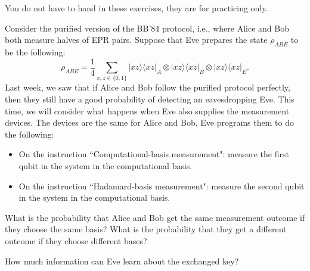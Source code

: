 \documentclass[a4paper,10pt,landscape,twocolumn]{scrartcl}
\newcommand{\ket}[1]{\lvert #1 \rangle}
\newcommand{\bra}[1]{\langle #1 \rvert}
\begin{document}
\practiceproblems

{\sffamily\noindent
You do not have to hand in these exercises, they are for practicing only. %
}

\begin{exercise}
Consider the purified version of the BB'84 protocol, i.e., where Alice and Bob both measure halves of EPR pairs. Suppose that Eve prepares the state $\rho_{ABE}$ to be the following:
\[
\rho_{ABE} = \frac{1}{4}\sum_{x,z \in \{0,1\}} \ket{xz}\bra{xz}_A \otimes \ket{xz}\bra{xz}_B \otimes \ket{xz}\bra{xz}_E.
\]
Last week, we saw that if Alice and Bob follow the purified protocol perfectly, then they still have a good probability of detecting an eavesdropping Eve. This time, we will consider what happens when Eve also supplies the measurement devices. The devices are the same for Alice and Bob. Eve programs them to do the following:
\begin{itemize}
	\item On the instruction ``Computational-basis measurement": measure the first qubit in the system in the computational basis.
	\item On the instruction ``Hadamard-basis measurement": measure the second qubit in the system in the computational basis.
\end{itemize}
\begin{subex}
	What is the probability that Alice and Bob get the same measurement outcome if they choose the same basis? What is the probability that they get a different outcome if they choose different bases?
\end{subex}
\begin{subex}
	How much information can Eve learn about the exchanged key?
\end{subex}
\end{exercise}
\end{document}
